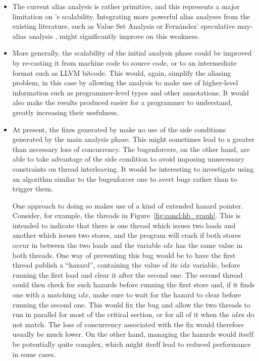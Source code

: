 \begin{itemize}
\item The current alias analysis is rather primitive, and this
  represents a major limitation on {\implementation}'s scalability.
  Integrating more powerful alias analyses from the existing
  literature, such as Value Set Analysis \cite{Balakrishnan2004} or
  Fern\'{a}ndez' speculative may-alias analysis \cite{Fernandez2002},
  might significantly improve on this weakness.
\item More generally, the scalability of the initial analysis phase
  could be improved by re-casting it from machine code to source code,
  or to an intermediate format such as LLVM bitcode.  This would,
  again, simplify the aliasing problem, in this case by allowing the
  analysis to make use of higher-level information such as
  programmer-level types and other annotations.  It would also make
  the results produced {\technique} easier for a programmer to
  understand, greatly increasing their usefulness.
\item At present, the fixes generated by {\implementation} make no use
  of the side conditions generated by the main analysis phase.  This
  might sometimes lead to a greater than necessary loss of
  concurrency.  The \glspl{bugenforcer}, on the other hand, are able
  to take advantage of the side condition to avoid imposing
  unnecessary constraints on thread interleaving.  It would be
  interesting to investigate using an algorithm similar to the
  \gls{bugenforcer} one to avert bugs rather than to trigger them.
  
  One approach to doing so makes use of a kind of extended hazard
  pointer\cite{Michael2004}.  Consider, for example, the threads in
  Figure~\ref{fig:concl:hb_graph}.  This is intended to indicate that
  there is one thread which issues two loads and another which issues
  two stores, and the program will crash if both stores occur in
  between the two loads and the variable $\mathit{idx}$ has the same
  value in both threads.  One way of preventing this bug would be to
  have the first thread publish a ``hazard'', containing the value of
  its $\mathit{idx}$ variable, before running the first load and clear
  it after the second one.  The second thread could then check for
  such hazards before running the first store and, if it finds one
  with a matching $\mathit{idx}$, make sure to wait for the hazard to
  clear before running the second one.  This would fix the bug and
  allow the two threads to run in parallel for most of the critical
  section, or for all of it when the $\mathit{idx}$s do not match.
  The loss of concurrency associated with the fix would therefore
  usually be much lower.  On the other hand, managing the hazards
  would itself be potentially quite complex, which might itself lead
  to reduced performance in some cases.
\end{itemize}

